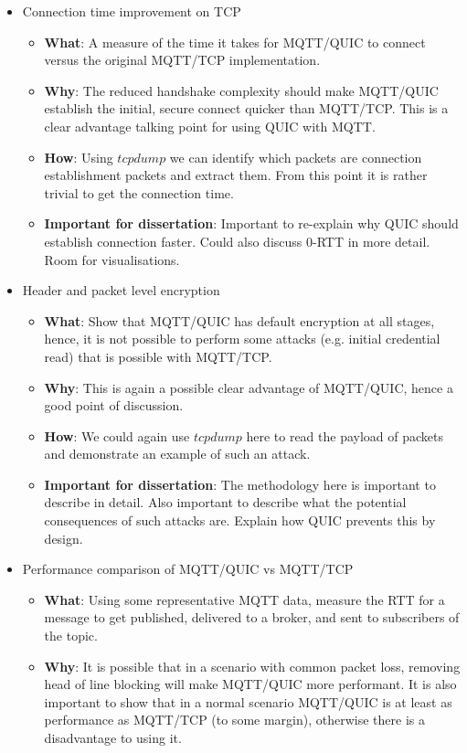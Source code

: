 \documentclass[a4paper,11pt]{article}
\begin{document}
\begin{itemize}
    \item Connection time improvement on TCP
    \begin{itemize}
        \item \textbf{What}: A measure of the time it takes for MQTT/QUIC to connect versus the original MQTT/TCP implementation.
        \item \textbf{Why}: The reduced handshake complexity should make MQTT/QUIC establish the initial, secure connect quicker than MQTT/TCP. This is a clear advantage talking point for using QUIC with MQTT.
        \item \textbf{How}: Using $tcpdump$ we can identify which packets are connection establishment packets and extract them. From this point it is rather trivial to get the connection time.
        \item \textbf{Important for dissertation}: Important to re-explain why QUIC should establish connection faster. Could also discuss 0-RTT in more detail. Room for visualisations.
    \end{itemize}
    \item Header and packet level encryption
    \begin{itemize}
        \item \textbf{What}: Show that MQTT/QUIC has default encryption at all stages, hence, it is not possible to perform some attacks (e.g. initial credential read) that is possible with MQTT/TCP.
        \item \textbf{Why}: This is again a possible clear advantage of MQTT/QUIC, hence a good point of discussion.
        \item \textbf{How}: We could again use $tcpdump$ here to read the payload of packets and demonstrate an example of such an attack.
        \item \textbf{Important for dissertation}: The methodology here is important to describe in detail. Also important to describe what the potential consequences of such attacks are. Explain how QUIC prevents this by design.
    \end{itemize}
    \item Performance comparison of MQTT/QUIC vs MQTT/TCP
    \begin{itemize}
        \item \textbf{What}: Using some representative MQTT data, measure the RTT for a message to get published, delivered to a broker, and sent to subscribers of the topic.
        \item \textbf{Why}: It is possible that in a scenario with common packet loss, removing head of line blocking will make MQTT/QUIC more performant. It is also important to show that in a normal scenario MQTT/QUIC is at least as performance as MQTT/TCP (to some margin), otherwise there is a disadvantage to using it.

\end{itemize}
\end{itemize}
\end{document}
